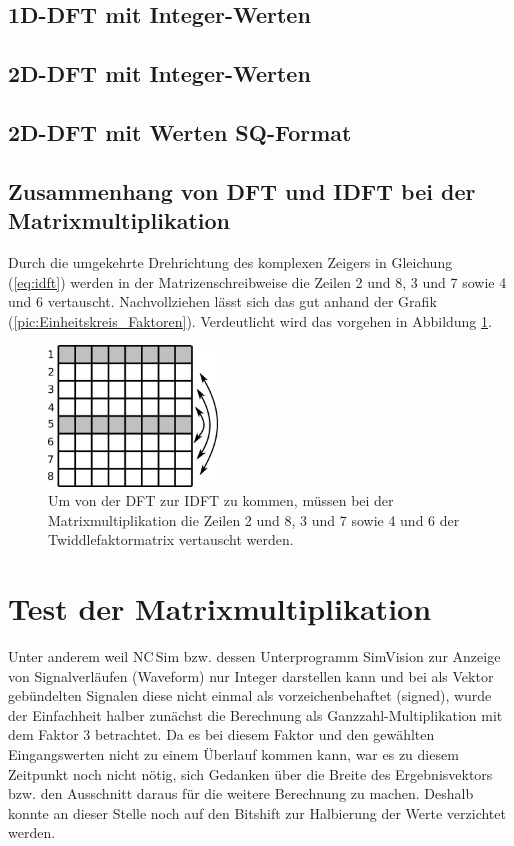 \subsection{1D-DFT mit Integer-Werten}
 
\subsection{2D-DFT mit Integer-Werten}

\subsection{2D-DFT mit Werten SQ-Format}

\subsection{Zusammenhang von DFT und IDFT bei der Matrixmultiplikation}

Durch die umgekehrte Drehrichtung des komplexen Zeigers in Gleichung (\ref{eq:idft}) werden in der Matrizenschreibweise die Zeilen 2 und 8, 3 und 7 sowie 4 und 6 vertauscht.
Nachvollziehen lässt sich das gut anhand der Grafik (\ref{pic:Einheitskreis_Faktoren}). 
Verdeutlicht wird das vorgehen in Abbildung \ref{pic:IDFT_Zeilentausch}.

\begin{figure}[ht]
 \centering
 \includegraphics[width=0.4\textwidth]{img/IDFT_Zeilentausch.png}
 \caption{Um von der DFT zur IDFT zu kommen, müssen bei der Matrixmultiplikation die Zeilen 2 und 8, 3 und 7 sowie 4 und 6 der Twiddlefaktormatrix vertauscht werden.}
 \label{pic:IDFT_Zeilentausch}
\end{figure}



\section{Test der Matrixmultiplikation}
Unter anderem weil NC\,Sim bzw. dessen Unterprogramm SimVision zur Anzeige von Signalverläufen (Waveform) nur Integer darstellen kann und bei als Vektor gebündelten Signalen 
diese nicht einmal als vorzeichenbehaftet (signed), wurde der Einfachheit halber zunächst die Berechnung als Ganzzahl-Multiplikation mit dem Faktor 3 betrachtet. 
Da es bei diesem Faktor und den gewählten Eingangswerten nicht zu einem 
Überlauf kommen kann, war es zu diesem Zeitpunkt noch nicht nötig, sich Gedanken über die Breite des Ergebnisvektors bzw. den Ausschnitt daraus für die weitere
Berechnung zu machen. Deshalb konnte an dieser Stelle noch auf den Bitshift zur Halbierung der Werte verzichtet werden.

